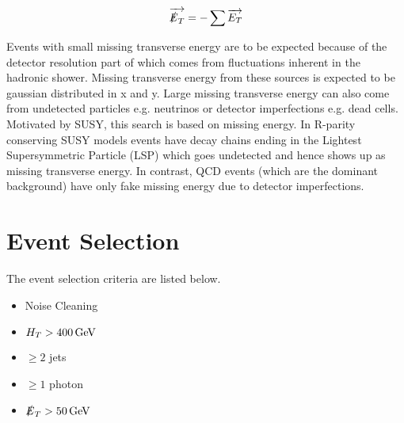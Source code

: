 \begin{equation}
\overrightarrow{\slashed{E}_{T}} = - \sum \overrightarrow{E_{T}}
\label{eq:met}
\end{equation}

Events with small missing transverse energy are to be expected because of the 
detector resolution part of which comes from fluctuations inherent in the 
hadronic shower. Missing transverse energy from these sources is expected to be 
gaussian distributed in x and y. Large missing transverse energy can also come 
from undetected particles e.g. neutrinos or detector imperfections e.g. dead 
cells. \\

Motivated by SUSY, this search is based on missing energy. In R-parity
conserving SUSY models events have decay chains ending in the Lightest 
Supersymmetric Particle (LSP) which goes undetected and hence shows up as 
missing transverse energy. In contrast, QCD events (which are the dominant 
background) have only fake missing energy due to detector imperfections. \\

\section{Event Selection}
\label{sec:Event_Selection}

The event selection criteria are listed below. 

\begin{itemize}
\item Noise Cleaning
\item $H_{T} > 400 \, \mathrm{GeV}$
\item $\geq 2$ jets
\item $\geq 1$ photon
\item $\slashed{E}_{T} > 50 \, \mathrm{GeV}$
\end{itemize}


